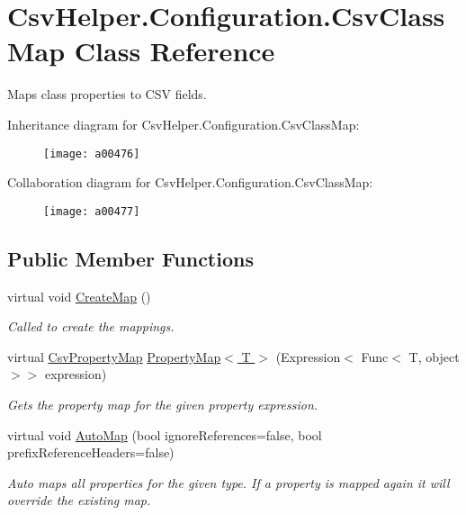 \hypertarget{a00060}{\section{Csv\-Helper.\-Configuration.\-Csv\-Class\-Map Class Reference}
\label{a00060}
}


Maps class properties to C\-S\-V fields.  




Inheritance diagram for Csv\-Helper.\-Configuration.\-Csv\-Class\-Map\-:
\nopagebreak
\begin{figure}[H]
\begin{center}
\leavevmode
\texttt{[image: a00476]}
\end{center}
\end{figure}


Collaboration diagram for Csv\-Helper.\-Configuration.\-Csv\-Class\-Map\-:
\nopagebreak
\begin{figure}[H]
\begin{center}
\leavevmode
\texttt{[image: a00477]}
\end{center}
\end{figure}
\subsection*{Public Member Functions}
\begin{DoxyCompactItemize}
\item 
virtual void \hyperlink{a00060_a83de9d28160d0d3da1e017df554a9481}{Create\-Map} ()
\begin{DoxyCompactList}\small\item\em Called to create the mappings. \end{DoxyCompactList}\item 
virtual \hyperlink{a00070}{Csv\-Property\-Map} \hyperlink{a00060_abab2b5cd5a290fd5d17116430b084420}{Property\-Map$<$ T $>$} (Expression$<$ Func$<$ T, object $>$$>$ expression)
\begin{DoxyCompactList}\small\item\em Gets the property map for the given property expression. \end{DoxyCompactList}\item 
virtual void \hyperlink{a00060_aec2097b09baaaac45171f91592af439d}{Auto\-Map} (bool ignore\-References=false, bool prefix\-Reference\-Headers=false)
\begin{DoxyCompactList}\small\item\em Auto maps all properties for the given type. If a property is mapped again it will override the existing map. \end{DoxyCompactList}\end{DoxyCompactItemize}
